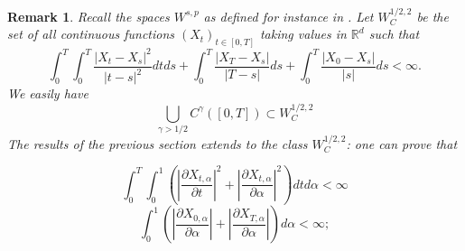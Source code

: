 \documentclass{article}
\newtheorem{lemma}[theorem]{Lemma}
\newtheorem{remark}[theorem]{Remark}
\begin{document}
\begin{remark}
\label{rem:sobolev}
Recall the spaces $W^{s,p}$ as defined for instance in \cite{Ad}. 
Let 
$W_{C}^{1/2,2}$ be the set of all continuous functions $%
\left( X_{t}\right) _{t\in \left[ 0,T\right] }$ taking values in $\mathbb{R}%
^{d}$ such that 
\begin{equation*}
\int_{0}^{T}\int_{0}^{T}\frac{\left| X_{t}-X_{s}\right| ^{2}}{\left|
t-s\right| ^{2}}dtds+\int_{0}^{T}\frac{\left| X_{T}-X_{s}\right| }{\left|
T-s\right| }ds+\int_{0}^{T}\frac{\left| X_{0}-X_{s}\right| }{\left| s\right| 
}ds<\infty .
\end{equation*}
We easily have 
\begin{equation*}
\bigcup_{\gamma >1/2}C^{\gamma }\left( \left[ 0,T\right] \right)
\subset W_{C}^{1/2,2}
\end{equation*}
The results of the previous section extends to the class
 $W^{1/2,2}_C$:  one can prove that


\begin{equation*}
\int_{0}^{T}\int_{0}^{1}\left( \left| \frac{\partial X_{t,\alpha }}{\partial
t}\right| ^{2}+\left| \frac{\partial X_{t,\alpha }}{\partial \alpha }\right|
^{2}\right) dtd\alpha <\infty
\end{equation*}
\begin{equation*}
\int_{0}^{1}\left( \left| \frac{\partial X_{0,\alpha }}{\partial \alpha }%
\right| +\left| \frac{\partial X_{T,\alpha }}{\partial \alpha }\right|
\right) d\alpha <\infty ;
\end{equation*}


\end{remark}
\end{document}
